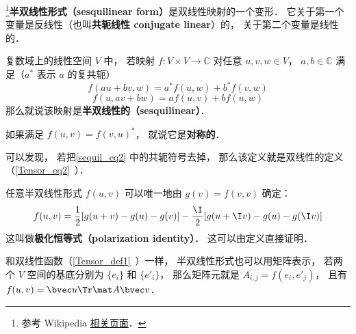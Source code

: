 
\begin{issues}
\issueDraft
\end{issues}

\footnote{参考 Wikipedia \href{https://en.wikipedia.org/wiki/Sesquilinear_form}{相关页面}．}\textbf{半双线性形式（sesquilinear form）}是双线性映射的一个变形． 它关于第一个变量是反线性（也叫\textbf{共轭线性 conjugate linear}）的， 关于第二个变量是线性的．
\begin{definition}{}\label{sequil_def1}
复数域上的线性空间 $V$ 中， 若映射 $f:V\times V\to \mathbb C$ 对任意 $u, v, w\in V$， $a,b\in \mathbb C$ 满足（$a^*$ 表示 $a$ 的复共轭）
\begin{equation}\label{sequil_eq2}
f(au+bv, w) = a^*f(u, w) + b^*f(v, w)
\end{equation}
\begin{equation}\label{sequil_eq1}
f(u, av+bw) = af(u, v) + bf(u, w)
\end{equation}
那么就说该映射是\textbf{半双线性的（sesquilinear）}．
\end{definition}
如果满足 $f(u, v) = f(v, u)^*$， 就说它是\textbf{对称的}．

可以发现， 若把\autoref{sequil_eq2} 中的共轭符号去掉， 那么该定义就是双线性的定义（\autoref{Tensor_eq2}~）．

任意半双线性形式 $f(u, v)$ 可以唯一地由 $g(v) = f(v, v)$ 确定：
\begin{equation}
f(u, v) =\frac{1}{2}[g(u+v)-g(u)-g(v)]
-\frac{\I}{2}[g(u+\I v)-g(u)-g(\I v)]
\end{equation}
这叫做\textbf{极化恒等式（polarization identity）}． 这可以由定义直接证明．

和双线性函数（\autoref{Tensor_def1}~）一样， 半双线性形式也可以用矩阵表示， 若两个 $V$ 空间的基底分别为 $\{e_i\}$ 和 $\{e'_i\}$， 那么矩阵元就是 $A_{i,j} = f(e_i, e'_j)$， 且有 $f(u, v) = \bvec u\Tr \mat A \bvec v$．



